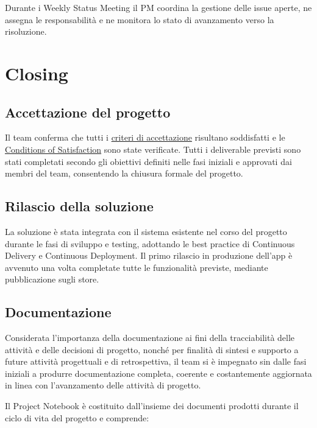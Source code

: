 \documentclass[11pt,a4paper]{article}
\begin{document}
{Durante i Weekly Status Meeting il PM coordina la gestione delle issue aperte, ne assegna le responsabilità e ne monitora lo stato di avanzamento verso la risoluzione.}
\newpage
\section{\texorpdfstring{{Closing}}{Closing}}\label{h.vyxy9edxdwlv}

\subsection{\texorpdfstring{{Accettazione del progetto}}{Accettazione del progetto}}\label{h.x006u04my7dd}

{Il team conferma che tutti i \hyperref[h.v5zosoywpqxe]{criteri di accettazione} risultano soddisfatti e le \hyperref[sec:cos]{Conditions of Satisfaction} sono state verificate. Tutti i deliverable previsti sono stati completati secondo gli obiettivi definiti nelle fasi iniziali e approvati dai membri del team, consentendo la chiusura formale del progetto.}

\subsection{\texorpdfstring{{Rilascio della soluzione}}{Rilascio della soluzione}}\label{h.ajr3dgd8joid}

{La soluzione è stata integrata con il sistema esistente nel corso del progetto durante le fasi di sviluppo e testing, adottando le best practice di Continuous Delivery e Continuous Deployment. Il primo rilascio in produzione dell’app è avvenuto una volta completate tutte le funzionalità previste, mediante pubblicazione sugli store.}

\subsection{\texorpdfstring{{Documentazione}}{Documentazione}}\label{h.vx1sjq7hlrc8}

{Considerata l’importanza della documentazione ai fini della tracciabilità delle attività e delle decisioni di progetto, nonché per finalità di sintesi e supporto a future attività progettuali e di retrospettiva, il team si è impegnato sin dalle fasi iniziali a produrre documentazione completa, coerente e costantemente aggiornata in linea con l’avanzamento delle attività di progetto.}

{Il Project Notebook è costituito dall’insieme dei documenti prodotti durante il ciclo di vita del progetto e comprende:}
\end{document}
